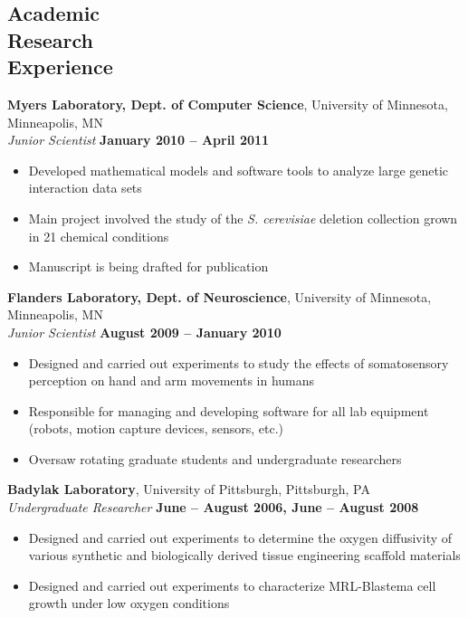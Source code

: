 \documentclass[margin,line]{resume}
\begin{document}
\begin{resume}
    \section{\mysidestyle Academic\\Research\\Experience}

    \textbf{Myers Laboratory, Dept. of Computer Science}, University of Minnesota, Minneapolis, MN \\\vspace{1mm}
    \textsl{Junior Scientist} \hfill \textbf{January 2010 -- April 2011}
    \begin{itemize}
    \item Developed mathematical models and software tools to analyze large genetic interaction data sets
    \item Main project involved the study of the \emph{S. cerevisiae} deletion collection grown in 21 chemical conditions
    \item Manuscript is being drafted for publication
    \end{itemize}

    \textbf{Flanders Laboratory, Dept. of Neuroscience}, University of Minnesota, Minneapolis, MN \\\vspace{1mm}
    \textsl{Junior Scientist} \hfill \textbf{August 2009 -- January 2010}
    \begin{itemize}
    \item Designed and carried out experiments to study the effects of somatosensory perception on hand and arm movements in humans
    \item Responsible for managing and developing software for all lab equipment (robots, motion capture devices, sensors, etc.)
    \item Oversaw rotating graduate students and undergraduate researchers
    \end{itemize}

    \textbf{Badylak Laboratory}, University of Pittsburgh, Pittsburgh, PA \\\vspace{1mm}%
    \textsl{Undergraduate Researcher} \hfill \textbf{June -- August 2006, June -- August 2008}
    \begin{itemize}
    \item Designed and carried out experiments to determine the oxygen diffusivity of various synthetic and 
    biologically derived tissue engineering scaffold materials
    \item Designed and carried out experiments to characterize MRL-Blastema cell growth under low oxygen conditions
    \end{itemize}


\end{resume}
\end{document}
